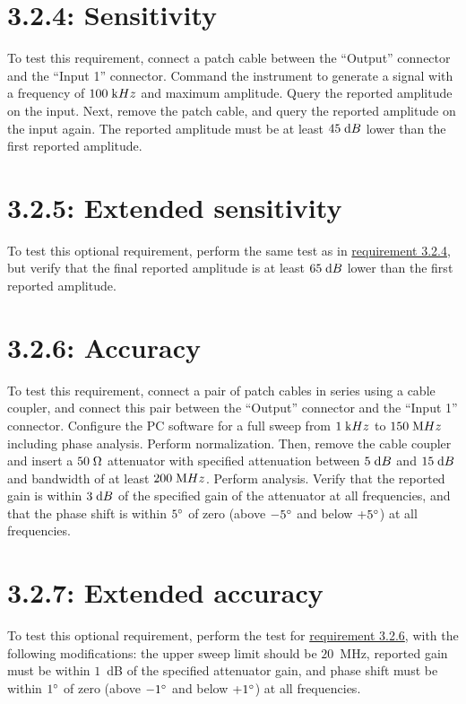 \section*{3.2.4: Sensitivity}
\label{tp:3.2.4}
To test this requirement, connect a patch cable between the ``Output'' connector and
the ``Input 1'' connector. Command the instrument to generate a signal with a frequency of
$100\;\mathrm{k}Hz$ and maximum amplitude. Query the reported amplitude on the input. Next,
remove the patch cable, and query the reported amplitude on the input again. The reported
amplitude must be at least $45\;\mathrm{d}B$ lower than the first reported amplitude.

\section*{3.2.5: Extended sensitivity}
To test this optional requirement, perform the same test as in \hyperref[tp:3.2.4]{requirement 3.2.4},
but verify that the final reported amplitude is at least $65\;\mathrm{d}B$ lower than the first reported amplitude.

\section*{3.2.6: Accuracy}
\label{tp:3.2.6}
To test this requirement, connect a pair of patch cables in series using a cable coupler,
and connect this pair between the ``Output'' connector and the ``Input 1'' connector. Configure
the PC software for a full sweep from $1\;\mathrm{k}Hz$ to $150\;\mathrm{M}Hz$ including phase analysis.
Perform normalization. Then, remove the cable coupler and insert a $50\;\mathrm{\Omega}$ attenuator with
specified attenuation between $5\;\mathrm{d}B$ and $15\;\mathrm{d}B$ and bandwidth of at least $200\;\mathrm{M}Hz$.
Perform analysis. Verify that the reported gain is within $3\;\mathrm{d}B$ of the specified gain of the
attenuator at all frequencies, and that the phase shift is within $5{}^\circ$ of zero
(above $-5{}^\circ$ and below $+5{}^\circ$) at all frequencies.

\section*{3.2.7: Extended accuracy}
To test this optional requirement, perform the test for \hyperref[tp:3.2.6]{requirement 3.2.6},
with the following modifications: the upper sweep limit should be $20$~MHz, reported gain must be
within $1$~dB of the specified attenuator gain, and phase shift must be within $1{}^\circ$ of zero
(above $-1{}^\circ$ and below $+1{}^\circ$) at all frequencies.

